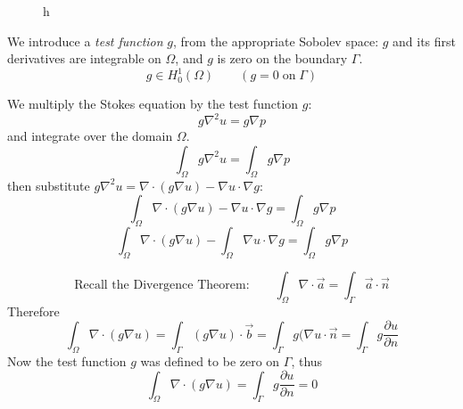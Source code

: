 \documentclass[12pt, a4paper, twoside, openright]{book}
\begin{document}
\vspace{1em}
\begin{figure}[ht]
\centering
{}
\caption{h}\label{h}
\end{figure}

We introduce a \emph{test function} $g$, from the appropriate Sobolev space:  $g$ and its first derivatives are integrable on $\Omega$, and $g$ is zero on the boundary $\Gamma$.
\begin{equation}
g \in H_0^1(\Omega) \qquad (g=0 \; \text{on} \; \Gamma)
\end{equation}

We multiply the Stokes equation by the test function $g$:
\begin{equation}
g \nabla^2 u = g \nabla p
\end{equation}
and integrate over the domain $\Omega$.
\begin{equation}
\int_{\Omega} g \nabla^2 u = \int_{\Omega} g \nabla p
\end{equation}
then substitute $g \nabla^2 u = \nabla \cdot (g \nabla u) - \nabla u \cdot \nabla g$:
\begin{equation}
\int_{\Omega} \nabla \cdot (g \nabla u) - \nabla u \cdot \nabla g  
= \int_{\Omega} g \nabla p
\end{equation}
\begin{equation}
\int_{\Omega} \nabla \cdot (g \nabla u) - \int_{\Omega} \nabla u \cdot \nabla g  
= \int_{\Omega} g \nabla p
\end{equation}

\begin{equation}
\text{Recall the Divergence Theorem:} \qquad
\int_{\Omega} \nabla \cdot \vec{a}  = \int_{\Gamma} \vec{a} \cdot \vec{n}
\end{equation}
Therefore
\begin{equation}
\int_{\Omega} \nabla \cdot (g \nabla u) = 
\int_{\Gamma} (g \nabla u) \cdot \vec{b} = \int_{\Gamma} g (\nabla u \cdot \vec{n}
= \int_{\Gamma} g \frac{\partial u}{\partial n}
\end{equation}
Now the test function $g$ was defined to be zero on $\Gamma$, thus
\begin{equation}
\int_{\Omega} \nabla \cdot (g \nabla u)
 = \int_{\Gamma} g \frac{\partial u}{\partial n} =0
\end{equation}
\end{document}
